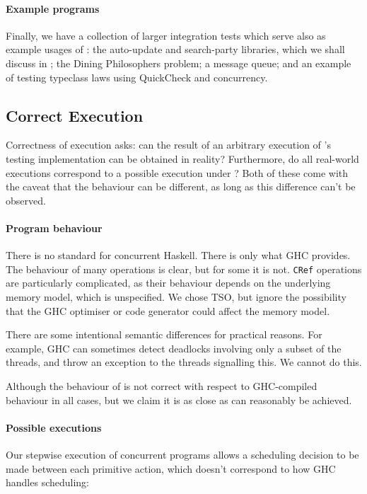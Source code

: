 \paragraph{Example programs}
Finally, we have a collection of larger integration tests which serve
also as example usages of \dejafu{}: the auto-update\cite{auto_update}
and search-party\cite{search_party} libraries, which we shall discuss
in ; the Dining Philosophers problem; a
message queue; and an example of testing typeclass laws using
QuickCheck\cite{claessen2000} and concurrency.

\subsection{Correct Execution}

Correctness of execution asks: can the result of an arbitrary
execution of \dejafu{}'s testing implementation can be obtained in
reality?  Furthermore, do all real-world executions correspond to a
possible execution under \dejafu{}?  Both of these come with the
caveat that the behaviour can be different, as long as this difference
can't be observed.

\paragraph{Program behaviour}
There is no standard for concurrent Haskell.  There is only what GHC
provides.  The behaviour of many operations is clear, but for some it
is not.  \verb|CRef| operations are particularly complicated, as their
behaviour depends on the underlying memory model, which is
unspecified.  We chose TSO, but ignore the possibility that the GHC
optimiser or code generator could affect the memory model.

There are some intentional semantic differences for practical reasons.
For example, GHC can sometimes detect deadlocks involving only a
subset of the threads, and throw an exception to the threads
signalling this.  We cannot do this.

Although the behaviour of \dejafu{} is not correct with respect to
GHC-compiled behaviour in all cases, but we claim it is as close as
can reasonably be achieved.

\paragraph{Possible executions}
Our stepwise execution of concurrent programs allows a scheduling
decision to be made between each primitive action, which doesn't
correspond to how GHC handles scheduling:

